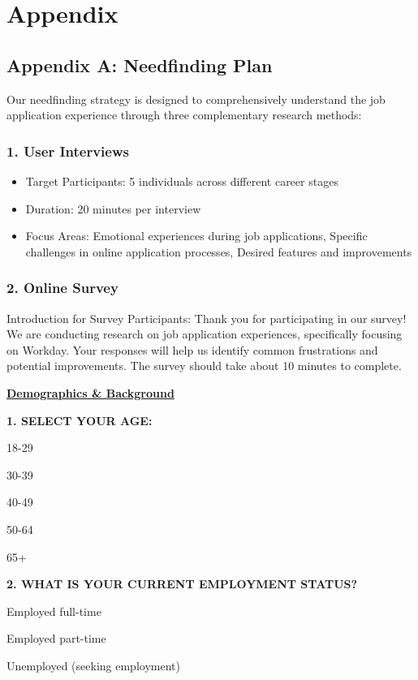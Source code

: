 \documentclass[
	letterpaper, %
]{jdf}
\begin{document}
\newpage
\section{Appendix}
\subsection{Appendix A: Needfinding Plan}

Our needfinding strategy is designed to comprehensively understand the job application experience through three complementary research methods:

\subsubsection{1. User Interviews}
\begin{itemize}
\item Target Participants: 5 individuals across different career stages
\item Duration: 20 minutes per interview
\item Focus Areas: Emotional experiences during job applications, Specific challenges in online application processes, Desired features and improvements
\end{itemize}
\hfill \break

\subsubsection{2. Online Survey}
Introduction for Survey Participants:
Thank you for participating in our survey! We are conducting research on job application experiences, specifically focusing on Workday. Your responses will help us identify common frustrations and potential improvements. The survey should take about 10 minutes to complete.

\underline{\textbf{Demographics \& Background}}

\textbf{1. SELECT YOUR AGE:}

18-29

30-39

40-49

50-64

65+

\hfill \break

\textbf{2. WHAT IS YOUR CURRENT EMPLOYMENT STATUS?}

Employed full-time

Employed part-time

Unemployed (seeking employment)
\end{document}
